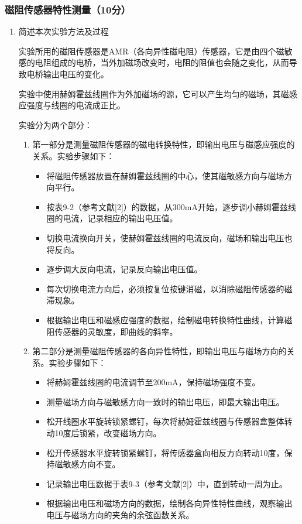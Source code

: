 \documentclass[dvipsnames, svgnames,a4paper,11pt]{article}
\begin{document}
	\subsubsection{磁阻传感器特性测量（10分）}
	\begin{enumerate}
		\item 简述本次实验方法及过程
		
		实验所用的磁阻传感器是AMR（各向异性磁电阻）传感器，它是由四个磁敏感的电阻组成的电桥，当外加磁场改变时，电阻的阻值也会随之变化，从而导致电桥输出电压的变化。
		
		实验中使用赫姆霍兹线圈作为外加磁场的源，它可以产生均匀的磁场，其磁感应强度与线圈的电流成正比。
		
		实验分为两个部分：
		\begin{enumerate}
			\item 第一部分是测量磁阻传感器的磁电转换特性，即输出电压与磁感应强度的关系。实验步骤如下：
			\begin{itemize}
				\item 将磁阻传感器放置在赫姆霍兹线圈的中心，使其磁敏感方向与磁场方向平行。
				\item 按表9-2（参考文献[2]）的数据，从300mA开始，逐步调小赫姆霍兹线圈的电流，记录相应的输出电压值。
				\item 切换电流换向开关，使赫姆霍兹线圈的电流反向，磁场和输出电压也将反向。
				\item 逐步调大反向电流，记录反向输出电压值。
				\item 每次切换电流方向后，必须按复位按键消磁，以消除磁阻传感器的磁滞现象。
				\item 根据输出电压和磁感应强度的数据，绘制磁电转换特性曲线，计算磁阻传感器的灵敏度，即曲线的斜率。
			\end{itemize}
			\item 第二部分是测量磁阻传感器的各向异性特性，即输出电压与磁场方向的关系。实验步骤如下：
			\begin{itemize}
				\item 将赫姆霍兹线圈的电流调节至200mA，保持磁场强度不变。
				\item 测量磁场方向与磁敏感方向一致时的输出电压，即最大输出电压。
				\item 松开线圈水平旋转锁紧螺钉，每次将赫姆霍兹线圈与传感器盒整体转动10度后锁紧，改变磁场方向。
				\item 松开传感器水平旋转锁紧螺钉，将传感器盒向相反方向转动10度，保持磁敏感方向不变。
				\item 记录输出电压数据于表9-3（参考文献[2]）中，直到转动一周为止。
				\item 根据输出电压和磁场方向的数据，绘制各向异性特性曲线，观察输出电压与磁场方向的夹角的余弦函数关系。
			\end{itemize}
		\end{enumerate}
		

\end{enumerate}
\end{document}

